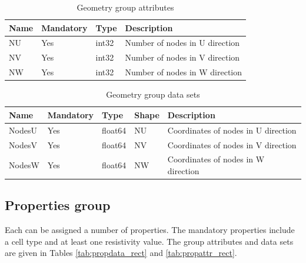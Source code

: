 \documentclass[10pt,a4paper]{article}
\begin{document}
\begin{table}[]
\centering
\caption{Geometry group attributes}
\label{tab:geomattr_rect}
\begin{tabular}{|l|l|l|l|}
\hline
Name & Mandatory & Type & Description \\ \hline
NU & Yes & int32 & Number of nodes in U direction \\ \hline
NV & Yes & int32 & Number of nodes in V direction \\ \hline
NW & Yes & int32 & Number of nodes in W direction \\ \hline
\end{tabular}
\end{table}

\begin{table}[]
\centering
\caption{Geometry group data sets}
\label{tab:geomdata_rect}
\begin{tabular}{|l|l|l|l|l|}
\hline
Name & Mandatory & Type & Shape & Description \\ \hline
NodesU & Yes & float64 & NU & Coordinates of nodes in U direction \\ \hline
NodesV & Yes & float64 & NV & Coordinates of nodes in V direction \\ \hline
NodesW & Yes & float64 & NW & Coordinates of nodes in W direction \\ \hline
\end{tabular}
\end{table}

\subsection{Properties group}

Each can be assigned a number of properties. The mandatory properties include a cell type and at least one resistivity value. The group attributes and data sets are given in Tables \ref{tab:propdata_rect} and \ref{tab:propattr_rect}.
\end{document}
